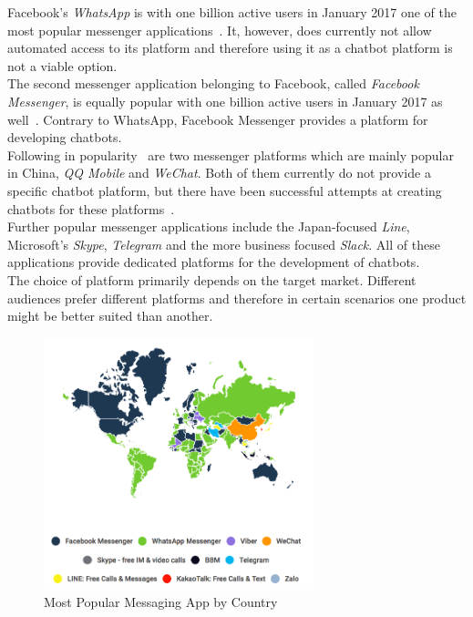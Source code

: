 Facebook's \emph{WhatsApp} is with one billion active users in January 2017 one of the most popular messenger applications~\cite{fbpopular}.
It, however, does currently not allow automated access to its platform and therefore using it as a chatbot platform is not a viable option.
\\
The second messenger application belonging to Facebook, called \emph{Facebook Messenger}, is equally popular with one billion active users in January 2017 as well~\cite{fbpopular}.
Contrary to WhatsApp, Facebook Messenger provides a platform for developing chatbots.
\\
Following in popularity~\cite{appusage} are two messenger platforms which are mainly popular in China, \emph{QQ Mobile} and \emph{WeChat}.
Both of them currently do not provide a specific chatbot platform,
but there have been successful attempts at creating chatbots for these platforms~\cite{wechatbot}.
\\
Further popular messenger applications include the Japan-focused \emph{Line}, Microsoft's \emph{Skype}, \emph{Telegram} and the more business focused \emph{Slack}.
All of these applications provide dedicated platforms for the development of chatbots.
\\

The choice of platform primarily depends on the target market.
Different audiences prefer different platforms and therefore in certain scenarios one product might be better suited than another.

\begin{figure}[H]
	\centering
	\includegraphics[width=0.7\textwidth]{images/similarweb-messenger-by-country.png}
	\caption{Most Popular Messaging App by Country~\cite{similarweb}}
	\label{fig:similarweb}
\end{figure}

